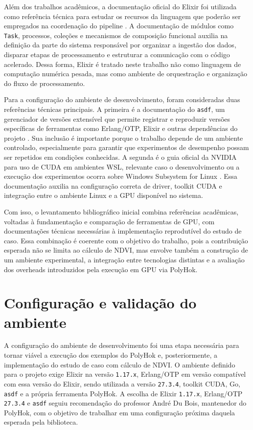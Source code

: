 \documentclass[tcc,capa]{texufpel}
\begin{document}
Além dos trabalhos acadêmicos, a documentação oficial do Elixir foi utilizada como referência técnica para estudar os recursos da linguagem que poderão ser empregados na coordenação do pipeline \cite{elixirDocs2026}. A documentação de módulos como \texttt{Task}, processos, coleções e mecanismos de composição funcional auxilia na definição da parte do sistema responsável por organizar a ingestão dos dados, disparar etapas de processamento e estruturar a comunicação com o código acelerado. Dessa forma, Elixir é tratado neste trabalho não como linguagem de computação numérica pesada, mas como ambiente de orquestração e organização do fluxo de processamento.

Para a configuração do ambiente de desenvolvimento, foram consideradas duas referências técnicas principais. A primeira é a documentação do \texttt{asdf}, um gerenciador de versões extensível que permite registrar e reproduzir versões específicas de ferramentas como Erlang/OTP, Elixir e outras dependências do projeto \cite{asdfDocs2026}. Sua inclusão é importante porque o trabalho depende de um ambiente controlado, especialmente para garantir que experimentos de desempenho possam ser repetidos em condições conhecidas. A segunda é o guia oficial da NVIDIA para uso de CUDA em ambientes WSL, relevante caso o desenvolvimento ou a execução dos experimentos ocorra sobre Windows Subsystem for Linux \cite{nvidiaCudaWsl2026}. Essa documentação auxilia na configuração correta de driver, toolkit CUDA e integração entre o ambiente Linux e a GPU disponível no sistema.

Com isso, o levantamento bibliográfico inicial combina referências acadêmicas, voltadas à fundamentação e comparação de ferramentas de GPU, com documentações técnicas necessárias à implementação reprodutível do estudo de caso. Essa combinação é coerente com o objetivo do trabalho, pois a contribuição esperada não se limita ao cálculo de NDVI, mas envolve também a construção de um ambiente experimental, a integração entre tecnologias distintas e a avaliação dos overheads introduzidos pela execução em GPU via PolyHok.

\section{Configuração e validação do ambiente}

A configuração do ambiente de desenvolvimento foi uma etapa necessária para tornar viável a execução dos exemplos do PolyHok e, posteriormente, a implementação do estudo de caso com cálculo de NDVI. O ambiente definido para o projeto exige Elixir na versão \texttt{1.17.x}, Erlang/OTP em versão compatível com essa versão do Elixir, sendo utilizada a versão \texttt{27.3.4}, toolkit CUDA, Go, \texttt{asdf} e a própria ferramenta PolyHok. A escolha de Elixir \texttt{1.17.x}, Erlang/OTP \texttt{27.3.4} e \texttt{asdf} seguiu recomendação do professor André Du Bois, mantenedor do PolyHok, com o objetivo de trabalhar em uma configuração próxima daquela esperada pela biblioteca.
\end{document}
